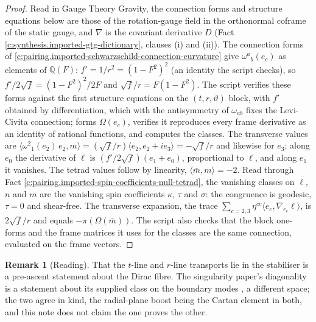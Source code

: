 \documentclass[11pt]{article}
\theoremstyle{definition}
\newtheorem{remark}[theorem]{Remark}
\theoremstyle{plain}
\providecommand{\Q}{}\renewcommand{\Q}{\mathbb{Q}}
\providecommand{\mb}{}\renewcommand{\mb}{\bar m}
\providecommand{\pv}{}\renewcommand{\pv}{\pi}
\providecommand{\ip}{}\renewcommand{\ip}[2]{\langle #1, #2\rangle}
\begin{document}
\begin{proof}
Read in Gauge Theory Gravity, the connection forms and structure equations below are those of the rotation-gauge field in the orthonormal coframe of the static gauge, and $\nabla$ is the covariant derivative $D$ (Fact \ref{c:synthesis.imported-gtg-dictionary}, clauses (i) and (ii)). The connection forms of \ref{c:pairing.imported-schwarzschild-connection-curvature} give $\omega^{a}{}_{b}(e_{c})$ as elements of $\Q(F)$: $f' = 1/r^{2} = (1 - F^{2})^{2}$ (an identity the script checks), so $f'/2\sqrt f = (1 - F^{2})^{2}/2F$ and $\sqrt f/r = F(1 - F^{2})$. The script verifies these forms against the first structure equations on the $(t, r, \vartheta)$ block, with $f'$ obtained by differentiation, which with the antisymmetry of $\omega_{ab}$ fixes the Levi-Civita connection; forms $\Omega(e_{c})$, verifies it reproduces every frame derivative as an identity of rational functions, and computes the classes. The transverse values are $\ip{\omega^{2}{}_{1}(e_{2})\,e_{2}}{m} = (\sqrt f/r)\ip{e_{2}}{e_{2} + ie_{3}} = -\sqrt f/r$ and likewise for $e_{3}$; along $e_{0}$ the derivative of $\ell$ is $(f'/2\sqrt f)(e_{1} + e_{0})$, proportional to $\ell$, and along $e_{1}$ it vanishes. The tetrad values follow by linearity, $\ip{\mb}{m} = -2$. Read through Fact \ref{c:pairing.imported-spin-coefficients-null-tetrad}, the vanishing classes on $\ell$, $n$ and $m$ are the vanishing spin coefficients $\kappa$, $\tau$ and $\sigma$: the congruence is geodesic, $\tau = 0$ and shear-free. The transverse expansion, the trace $\sum_{c = 2,3}\eta^{cc}\ip{e_{c}}{\nabla_{e_{c}}\ell}$, is $2\sqrt f/r$ and equals $-\pv(\Omega(\mb))$. The script also checks that the block one-forms and the frame matrices it uses for the classes are the same connection, evaluated on the frame vectors.

\end{proof}

\begin{remark}[Reading]\label{c:note.pairing.reading-2}
That the $t$-line and $r$-line transports lie in the stabiliser is a pre-ascent statement about the Dirac fibre. The singularity paper's diagonality is a statement about its supplied class on the boundary modes \cite[Prop.~7.31, Thm.~C.8]{ButlerT5}, a different space; the two agree in kind, the radial-plane boost being the Cartan element in both, and this note does not claim the one proves the other.
\end{remark}
\end{document}
